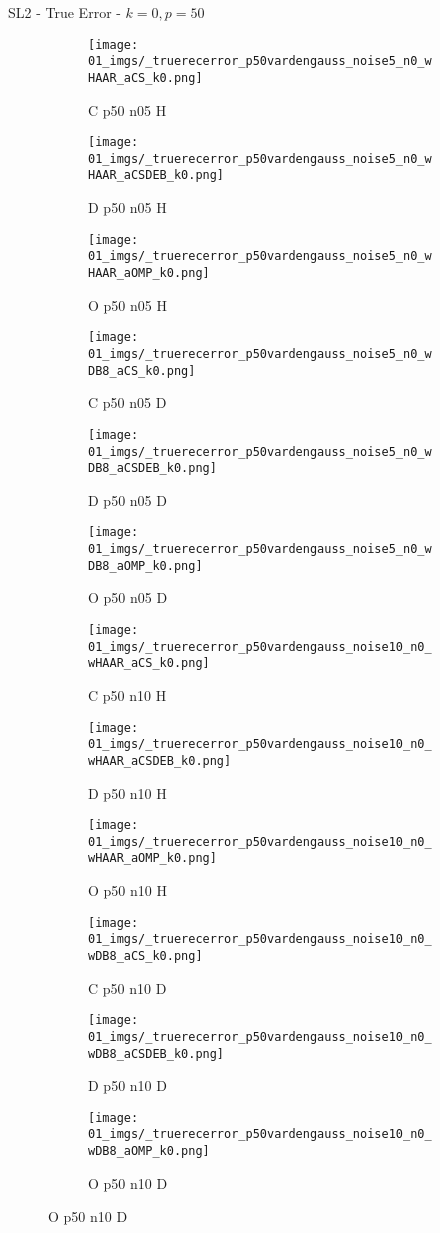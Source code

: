 \begin{frame}{SL2 - True Error - $k=0,p=50$}{}
\begin{figure}
\begin{subfigure}{0.13\textwidth}
\texttt{[image: 01\_imgs/\_truerecerror\_p50vardengauss\_noise5\_n0\_wHAAR\_aCS\_k0.png]}
\caption*{\tiny C p50 n05 H}
\end{subfigure}
\begin{subfigure}{0.13\textwidth}
\texttt{[image: 01\_imgs/\_truerecerror\_p50vardengauss\_noise5\_n0\_wHAAR\_aCSDEB\_k0.png]}
\caption*{\tiny D p50 n05 H}
\end{subfigure}
\begin{subfigure}{0.13\textwidth}
\texttt{[image: 01\_imgs/\_truerecerror\_p50vardengauss\_noise5\_n0\_wHAAR\_aOMP\_k0.png]}
\caption*{\tiny O p50 n05 H}
\end{subfigure}
\begin{subfigure}{0.13\textwidth}
\texttt{[image: 01\_imgs/\_truerecerror\_p50vardengauss\_noise5\_n0\_wDB8\_aCS\_k0.png]}
\caption*{\tiny C p50 n05 D}
\end{subfigure}
\begin{subfigure}{0.13\textwidth}
\texttt{[image: 01\_imgs/\_truerecerror\_p50vardengauss\_noise5\_n0\_wDB8\_aCSDEB\_k0.png]}
\caption*{\tiny D p50 n05 D}
\end{subfigure}
\begin{subfigure}{0.13\textwidth}
\texttt{[image: 01\_imgs/\_truerecerror\_p50vardengauss\_noise5\_n0\_wDB8\_aOMP\_k0.png]}
\caption*{\tiny O p50 n05 D}
\end{subfigure}

\vspace{5pt}

\begin{subfigure}{0.13\textwidth}
\texttt{[image: 01\_imgs/\_truerecerror\_p50vardengauss\_noise10\_n0\_wHAAR\_aCS\_k0.png]}
\caption*{\tiny C p50 n10 H}
\end{subfigure}
\begin{subfigure}{0.13\textwidth}
\texttt{[image: 01\_imgs/\_truerecerror\_p50vardengauss\_noise10\_n0\_wHAAR\_aCSDEB\_k0.png]}
\caption*{\tiny D p50 n10 H}
\end{subfigure}
\begin{subfigure}{0.13\textwidth}
\texttt{[image: 01\_imgs/\_truerecerror\_p50vardengauss\_noise10\_n0\_wHAAR\_aOMP\_k0.png]}
\caption*{\tiny O p50 n10 H}
\end{subfigure}
\begin{subfigure}{0.13\textwidth}
\texttt{[image: 01\_imgs/\_truerecerror\_p50vardengauss\_noise10\_n0\_wDB8\_aCS\_k0.png]}
\caption*{\tiny C p50 n10 D}
\end{subfigure}
\begin{subfigure}{0.13\textwidth}
\texttt{[image: 01\_imgs/\_truerecerror\_p50vardengauss\_noise10\_n0\_wDB8\_aCSDEB\_k0.png]}
\caption*{\tiny D p50 n10 D}
\end{subfigure}
\begin{subfigure}{0.13\textwidth}
\texttt{[image: 01\_imgs/\_truerecerror\_p50vardengauss\_noise10\_n0\_wDB8\_aOMP\_k0.png]}
\caption*{\tiny O p50 n10 D}
\end{subfigure}


\end{figure}
\end{frame}
